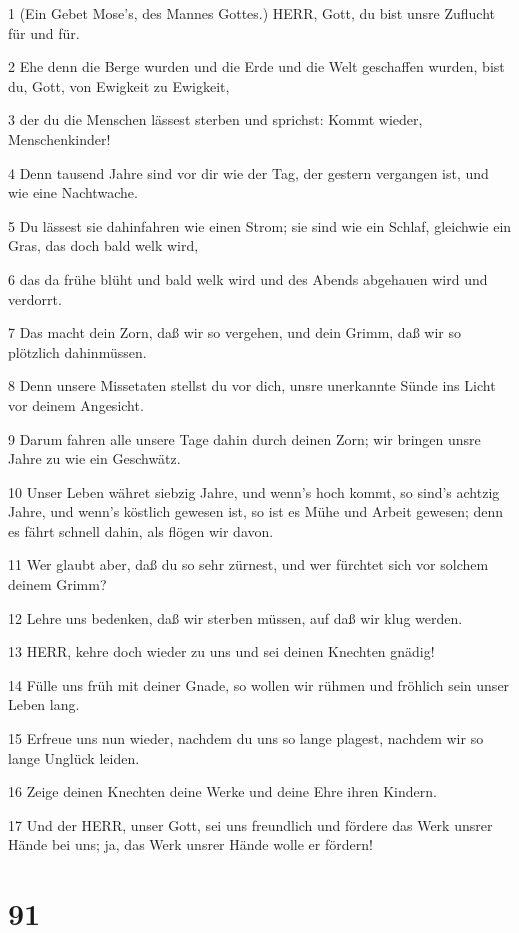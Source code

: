 \par 1 (Ein Gebet Mose's, des Mannes Gottes.) HERR, Gott, du bist unsre Zuflucht für und für.
\par 2 Ehe denn die Berge wurden und die Erde und die Welt geschaffen wurden, bist du, Gott, von Ewigkeit zu Ewigkeit,
\par 3 der du die Menschen lässest sterben und sprichst: Kommt wieder, Menschenkinder!
\par 4 Denn tausend Jahre sind vor dir wie der Tag, der gestern vergangen ist, und wie eine Nachtwache.
\par 5 Du lässest sie dahinfahren wie einen Strom; sie sind wie ein Schlaf, gleichwie ein Gras, das doch bald welk wird,
\par 6 das da frühe blüht und bald welk wird und des Abends abgehauen wird und verdorrt.
\par 7 Das macht dein Zorn, daß wir so vergehen, und dein Grimm, daß wir so plötzlich dahinmüssen.
\par 8 Denn unsere Missetaten stellst du vor dich, unsre unerkannte Sünde ins Licht vor deinem Angesicht.
\par 9 Darum fahren alle unsere Tage dahin durch deinen Zorn; wir bringen unsre Jahre zu wie ein Geschwätz.
\par 10 Unser Leben währet siebzig Jahre, und wenn's hoch kommt, so sind's achtzig Jahre, und wenn's köstlich gewesen ist, so ist es Mühe und Arbeit gewesen; denn es fährt schnell dahin, als flögen wir davon.
\par 11 Wer glaubt aber, daß du so sehr zürnest, und wer fürchtet sich vor solchem deinem Grimm?
\par 12 Lehre uns bedenken, daß wir sterben müssen, auf daß wir klug werden.
\par 13 HERR, kehre doch wieder zu uns und sei deinen Knechten gnädig!
\par 14 Fülle uns früh mit deiner Gnade, so wollen wir rühmen und fröhlich sein unser Leben lang.
\par 15 Erfreue uns nun wieder, nachdem du uns so lange plagest, nachdem wir so lange Unglück leiden.
\par 16 Zeige deinen Knechten deine Werke und deine Ehre ihren Kindern.
\par 17 Und der HERR, unser Gott, sei uns freundlich und fördere das Werk unsrer Hände bei uns; ja, das Werk unsrer Hände wolle er fördern!

\chapter{91}

